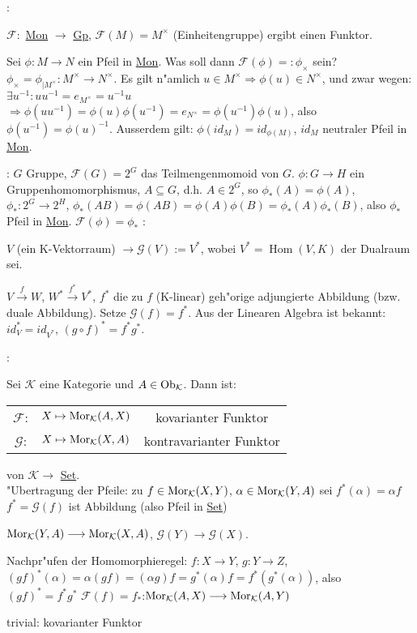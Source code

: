:{
$\mathcal{F}:$ \underline{Mon} $\longrightarrow$ \underline{Gp}, $\mathcal{F}(M)=M^{\times}$
(Einheitengruppe) ergibt einen Funktor.

Sei $\phi :M\longrightarrow N$ ein Pfeil in \underline{Mon}.
Was soll dann $\mathcal{F}(\phi)=: \phi _{\times}$ sein?\\
$\phi_{\times}=\phi _{| M^\times}:M^{\times}\longrightarrow N^{\times}$.
Es gilt n"amlich $u\in M^{\times} \Rightarrow \phi(u)\in N^{\times}$, und zwar wegen:
$\exists u^{-1}:uu^{-1}=e_{M^{\times}}=u^{-1}u$
$\Rightarrow \phi(uu^{-1})=\phi(u)\phi(u^{-1})=e_{N^{\times}}=\phi(u^{-1})\phi(u)$,
also $\phi(u^{-1})=\phi(u)^{-1}$. Ausserdem gilt: $\phi(id_M)=id_{\phi(M)}$, 
$id_M$ neutraler Pfeil in \underline{Mon}. 
}
:{ $G$ Gruppe, $\mathcal{F}(G)=2^G$ das Teilmengenmomoid von $G$.
$\phi: G\longrightarrow H$ ein Gruppenhomomorphismus, $A\subseteq G$, d.h.
$A\in 2^G$, so $\phi _*(A)=\phi(A)$,
$\phi _*: 2^G \longrightarrow 2^H$, $\phi _*(AB)=\phi(AB)=\phi(A)\phi(B)=\phi _*(A)\phi _*(B)$,
also $\phi _*$ Pfeil in \underline{Mon}. $\mathcal{F}(\phi)=\phi_*$
}
:{$V$ (ein K-Vektorraum) $\longrightarrow \mathcal{G}(V):=V^*$,
wobei $V^*=\operatorname{Hom}(V,K)$ der Dualraum sei.

$V\stackrel{f}{\longrightarrow} W$, $W^* \stackrel{f^*}{\longrightarrow} V^*$,
$f^*$ die zu $f$ (K-linear) geh"orige adjungierte Abbildung (bzw. duale Abbildung).
Setze $\mathcal{G}(f)=f^*$. Aus der Linearen Algebra ist bekannt: $id_V^*=id_{V^*}$,
$(g\circ f)^*=f^*g^*$.
}
:{
Sei $\mathcal{K}$ eine Kategorie und $A\in \operatorname{Ob}_{\mathcal{K}}$. Dann ist:

\begin{tabular}{ccc}
$\mathcal{F}$: & $X\mapsto \Mor(K;A;X)$ & kovarianter Funktor \\
$\mathcal{G}$: & $X\mapsto \Mor(K;X;A)$ & kontravarianter Funktor \\
\end{tabular}
von $\mathcal{K}\longrightarrow$ \underline{Set}.\\
"Ubertragung der Pfeile: zu $f\in \Mor(K;X;Y)$, $\alpha \in \Mor(K;Y;A)$ sei $f^*(\alpha)=\alpha f$
$f^*=\mathcal{G}(f)$ ist Abbildung (also Pfeil in \underline{Set})

$\Mor(K;Y;A) \longrightarrow \Mor(K;X;A)$, $\mathcal{G}(Y) \longrightarrow \mathcal{G}(X)$.

Nachpr"ufen der Homomorphieregel: $f:X \longrightarrow Y$, $g:Y \longrightarrow Z$,
$(gf)^*(\alpha)=\alpha(gf)=(\alpha g)f=g^*(\alpha)f=f^*(g^*(\alpha))$, also
$(gf)^*=f^*g^*$
$\mathcal{F}(f)=f_*$:$\Mor(K;A;X) \longrightarrow \Mor(K;A;Y)$

trivial: kovarianter Funktor
}
